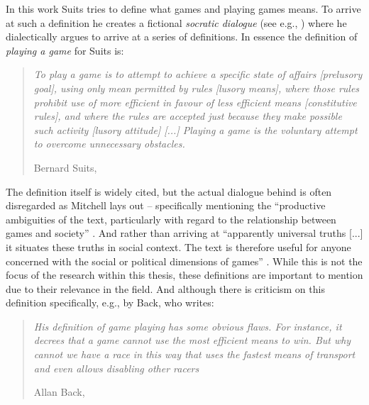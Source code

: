 In this work Suits tries to define what games and playing games means. To arrive at such a definition he creates a fictional \textit{socratic dialogue} (see e.g., \cite{berlin2004methodology}) where he dialectically argues to arrive at a series of definitions. In essence the definition of \textit{playing a game} for Suits is:

\begin{quote}
  \textit{To play a game is to attempt to achieve a specific state of affairs [prelusory goal], using only mean permitted by rules [lusory means], where those rules prohibit use of more efficient in favour of less efficient means [constitutive rules], and where the rules are accepted just because they make possible such activity [lusory attitude] [...] Playing a game is the voluntary attempt to overcome unnecessary obstacles.}

  \footnotesize{Bernard Suits, \cite[p.35]{suits2020grasshopper}}
\end{quote}

The definition itself is widely cited, but the actual dialogue behind is often disregarded as Mitchell lays out -- specifically mentioning the \enquote{productive ambiguities of the text, particularly with regard to the relationship between games and society} \cite{mitchell2020reconsidering}. And rather than arriving at \enquote{apparently universal truths [...] it situates these truths in social context. The text is therefore useful for anyone concerned with the social or political dimensions of games} \cite{mitchell2020reconsidering}. While this is not the focus of the research within this thesis, these definitions are important to mention due to their relevance in the field. And although there is criticism on this definition specifically, e.g., by Back, who writes:

\begin{quote}
  \textit{His definition of game playing has some obvious flaws. For instance, it decrees that a game cannot use the most efficient means to win. But why cannot we have a race in this way that uses the fastest means of transport and even allows disabling other racers}

  \footnotesize{Allan Back, \cite[p. 5]{back2008paper}}
\end{quote}

